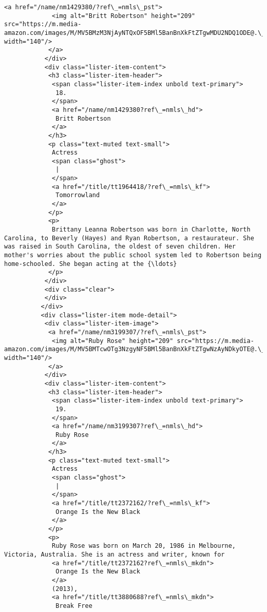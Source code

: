 \documentclass[11pt]{article}
\begin{document}
\begin{Verbatim}[commandchars=\\\{\}]
            <a href="/name/nm1429380/?ref\_=nmls\_pst">
             <img alt="Britt Robertson" height="209" src="https://m.media-amazon.com/images/M/MV5BMzM3NjAyNTQxOF5BMl5BanBnXkFtZTgwMDU2NDQ1ODE@.\_V1\_UX140\_CR0,0,140,209\_AL\_.jpg" width="140"/>
            </a>
           </div>
           <div class="lister-item-content">
            <h3 class="lister-item-header">
             <span class="lister-item-index unbold text-primary">
              18.
             </span>
             <a href="/name/nm1429380?ref\_=nmls\_hd">
              Britt Robertson
             </a>
            </h3>
            <p class="text-muted text-small">
             Actress
             <span class="ghost">
              |
             </span>
             <a href="/title/tt1964418/?ref\_=nmls\_kf">
              Tomorrowland
             </a>
            </p>
            <p>
             Brittany Leanna Robertson was born in Charlotte, North Carolina, to Beverly (Hayes) and Ryan Robertson, a restaurateur. She was raised in South Carolina, the oldest of seven children. Her mother's worries about the public school system led to Robertson being home-schooled. She began acting at the {\ldots}
            </p>
           </div>
           <div class="clear">
           </div>
          </div>
          <div class="lister-item mode-detail">
           <div class="lister-item-image">
            <a href="/name/nm3199307/?ref\_=nmls\_pst">
             <img alt="Ruby Rose" height="209" src="https://m.media-amazon.com/images/M/MV5BMTcwOTg3NzgyNF5BMl5BanBnXkFtZTgwNzAyNDkyOTE@.\_V1\_UY209\_CR34,0,140,209\_AL\_.jpg" width="140"/>
            </a>
           </div>
           <div class="lister-item-content">
            <h3 class="lister-item-header">
             <span class="lister-item-index unbold text-primary">
              19.
             </span>
             <a href="/name/nm3199307?ref\_=nmls\_hd">
              Ruby Rose
             </a>
            </h3>
            <p class="text-muted text-small">
             Actress
             <span class="ghost">
              |
             </span>
             <a href="/title/tt2372162/?ref\_=nmls\_kf">
              Orange Is the New Black
             </a>
            </p>
            <p>
             Ruby Rose was born on March 20, 1986 in Melbourne, Victoria, Australia. She is an actress and writer, known for
             <a href="/title/tt2372162?ref\_=nmls\_mkdn">
              Orange Is the New Black
             </a>
             (2013),
             <a href="/title/tt3880688?ref\_=nmls\_mkdn">
              Break Free

\end{Verbatim}
\end{document}
